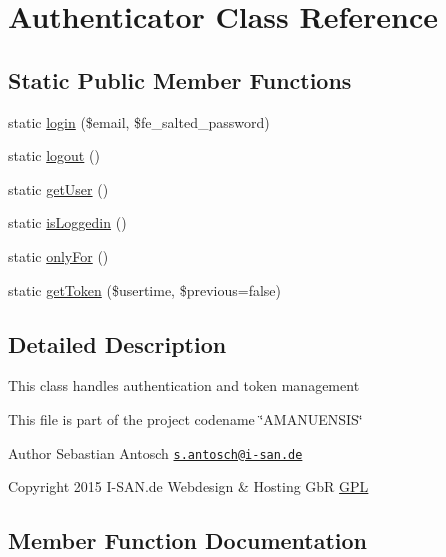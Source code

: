 \hypertarget{class_authenticator}{}\section{Authenticator Class Reference}
\label{class_authenticator}
\subsection*{Static Public Member Functions}
\begin{DoxyCompactItemize}
\item 
static \hyperlink{class_authenticator_a921f34c24bb947352d4f4c86eeac6338}{login} (\$email, \$fe\+\_\+salted\+\_\+password)
\item 
static \hyperlink{class_authenticator_a1e34160e903835a43123f538e93457a2}{logout} ()
\item 
static \hyperlink{class_authenticator_aeeb9b927f96ebe9c88760d70afa39abe}{get\+User} ()
\item 
static \hyperlink{class_authenticator_ac444a5882fe96e442c4f9b9eeb3ea4e0}{is\+Loggedin} ()
\item 
static \hyperlink{class_authenticator_a728b64c20e46e9f21ade1980c6c8406a}{only\+For} ()
\item 
static \hyperlink{class_authenticator_af02a6b16693d143376f591527213412d}{get\+Token} (\$usertime, \$previous=false)
\end{DoxyCompactItemize}


\subsection{Detailed Description}
This class handles authentication and token management

This file is part of the project codename \char`\"{}\+A\+M\+A\+N\+U\+E\+N\+S\+I\+S\char`\"{}

\begin{DoxyAuthor}{Author}
Sebastian Antosch \href{mailto:s.antosch@i-san.de}{\tt s.\+antosch@i-\/san.\+de} 
\end{DoxyAuthor}
\begin{DoxyCopyright}{Copyright}
2015 I-\/\+S\+A\+N.\+de Webdesign \& Hosting Gb\+R \hyperlink{}{G\+P\+L }
\end{DoxyCopyright}


\subsection{Member Function Documentation}
\hypertarget{class_authenticator_a921f34c24bb947352d4f4c86eeac6338}{}
